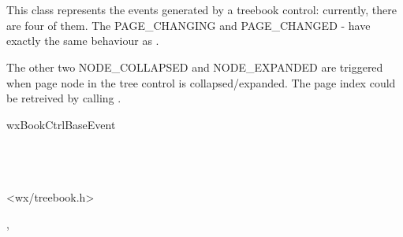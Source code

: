 
\section{}\label{wxtreebookevent}

This class represents the events generated by a treebook control: currently,
there are four of them. The PAGE\_CHANGING and PAGE\_CHANGED - have exactly the same
behaviour as .

The other two NODE\_COLLAPSED and NODE\_EXPANDED are triggered when page node in the tree control
is collapsed/expanded. The page index could be retreived by calling
.




wxBookCtrlBaseEvent\\
\\
\\
\\




<wx/treebook.h>










, 





\label{wxtreebookeventwxtreebookevent}

